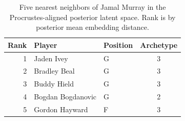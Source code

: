 \begin{table}[htbp]
  \centering\small
  \begin{tabular}{rllc}
    \toprule
    Rank & Player & Position & Archetype \\
    \midrule
    1 & Jaden Ivey & G & 3 \\
    2 & Bradley Beal & G & 3 \\
    3 & Buddy Hield & G & 3 \\
    4 & Bogdan Bogdanovic & G & 2 \\
    5 & Gordon Hayward & F & 3 \\
    \bottomrule
  \end{tabular}
  \caption{Five nearest neighbors of Jamal Murray in the Procrustes-aligned posterior latent space. Rank is by posterior mean embedding distance.}
  \label{tab:Jamal_Murray_neighbors}
\end{table}

